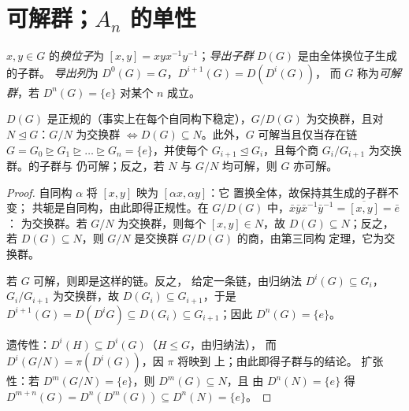 \section{可解群；\texorpdfstring{$A_n$}{An} 的单性}

\begin{definition}\label{def:b3:groups:derived}
$x, y \in G$ 的\emph{换位子}为 $[x,y]
= xyx^{-1}y^{-1}$；\emph{导出子群}
$D(G)$ 是由全体换位子生成的子群。
\emph{导出列}为 $D^0(G) = G$，$D^{i+1}(G) = D(D^i(G))$，
而 $G$ 称为\emph{可解群}，若 $D^n(G) =
\{e\}$ 对某个 $n$ 成立。
\end{definition}

\begin{proposition}\label{prop:b3:groups:derived}
$D(G)$ 是正规的（事实上在每个自同构下稳定），$G/D(G)$
为交换群，且对 $N \trianglelefteq G$：$G/N$ 为交换群 $\iff
D(G) \subseteq N$。此外，$G$ 可解当且仅当存在链
$G = G_0 \trianglerighteq G_1 \trianglerighteq \dots
\trianglerighteq G_n = \{e\}$，并使每个 $G_{i+1} \trianglelefteq
G_i$，且每个商 $G_i/G_{i+1}$ 为交换群。的子群与
仍可解；反之，若 $N$ 与
$G/N$ 均可解，则 $G$ 亦可解。
\end{proposition}

\begin{proof}
自同构 $\alpha$ 将 $[x,y]$ 映为 $[\alpha x, \alpha y]$：它
置换全体，故保持其生成的子群不变；
共轭是自同构，由此即得正规性。在 $G/D(G)$
中，$\bar x\bar y \bar x^{-1}\bar y^{-1} = \overline{[x,y]} = \bar e$：
为交换群。若 $G/N$ 为交换群，则每个 $[x,y] \in
N$，故 $D(G) \subseteq N$；反之，若 $D(G) \subseteq N$，则
$G/N$ 是交换群 $G/D(G)$ 的商，由第三同构
定理，它为交换群。

若 $G$ 可解，则即是这样的链。反之，
给定一条链，由归纳法 $D^i(G) \subseteq G_i$，$G_i/G_{i+1}$
为交换群，故 $D(G_i) \subseteq G_{i+1}$，于是 $D^{i+1}(G) = D(D^i G)
\subseteq D(G_i) \subseteq G_{i+1}$；因此 $D^n(G) = \{e\}$。

遗传性：$D^i(H) \subseteq D^i(G)$（$H \leq G$，由归纳法），
而 $D^i(G/N) = \pi(D^i(G))$，因 $\pi$ 将映到
上；由此即得子群与的结论。
扩张性：若 $D^m(G/N) = \{e\}$，则 $D^m(G) \subseteq N$，且
由 $D^n(N) = \{e\}$ 得 $D^{m+n}(G) = D^n(D^m(G)) \subseteq D^n(N)
= \{e\}$。
\end{proof}

